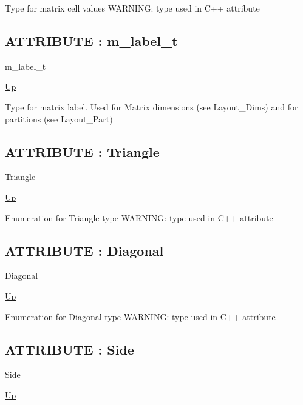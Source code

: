 \par
Type for matrix cell values WARNING: type used in C++ attribute
\par
\subsection*{ATTRIBUTE : m\_label\_t}
\hypertarget{ecldoc:pbblas.types.m_label_t}{}
\begin{minipage}[t]{\textwidth}
\begin{flushleft}
 m\_label\_t 
\end{flushleft}
\end{minipage}
\hyperlink{ecldoc:PBblas.Types}{Up}

\par
Type for matrix label. Used for Matrix dimensions (see Layout\_Dims) and for partitions (see Layout\_Part)
\par
\subsection*{ATTRIBUTE : Triangle}
\hypertarget{ecldoc:ecldoc-Triangle}{}
\begin{minipage}[t]{\textwidth}
\begin{flushleft}
 Triangle 
\end{flushleft}
\end{minipage}
\hyperlink{ecldoc:PBblas.Types}{Up}

\par
Enumeration for Triangle type WARNING: type used in C++ attribute
\par
\subsection*{ATTRIBUTE : Diagonal}
\hypertarget{ecldoc:ecldoc-Diagonal}{}
\begin{minipage}[t]{\textwidth}
\begin{flushleft}
 Diagonal 
\end{flushleft}
\end{minipage}
\hyperlink{ecldoc:PBblas.Types}{Up}

\par
Enumeration for Diagonal type WARNING: type used in C++ attribute
\par
\subsection*{ATTRIBUTE : Side}
\hypertarget{ecldoc:ecldoc-Side}{}
\begin{minipage}[t]{\textwidth}
\begin{flushleft}
 Side 
\end{flushleft}
\end{minipage}
\hyperlink{ecldoc:PBblas.Types}{Up}

